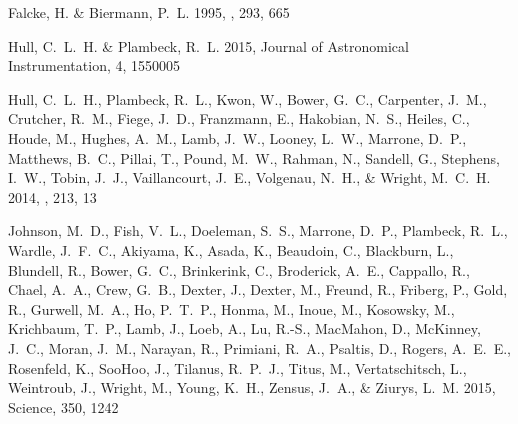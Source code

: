 \documentclass[12pt,preprint]{aastex}
\begin{document}
\begin{thebibliography}{34}
{Falcke}, H. \& {Biermann}, P.~L. 1995, \aap, 293, 665

{Hull}, C.~L.~H. \& {Plambeck}, R.~L. 2015, Journal of Astronomical
  Instrumentation, 4, 1550005

{Hull}, C.~L.~H., {Plambeck}, R.~L., {Kwon}, W., {Bower}, G.~C., {Carpenter},
  J.~M., {Crutcher}, R.~M., {Fiege}, J.~D., {Franzmann}, E., {Hakobian}, N.~S.,
  {Heiles}, C., {Houde}, M., {Hughes}, A.~M., {Lamb}, J.~W., {Looney}, L.~W.,
  {Marrone}, D.~P., {Matthews}, B.~C., {Pillai}, T., {Pound}, M.~W., {Rahman},
  N., {Sandell}, G., {Stephens}, I.~W., {Tobin}, J.~J., {Vaillancourt}, J.~E.,
  {Volgenau}, N.~H., \& {Wright}, M.~C.~H. 2014, \apjs, 213, 13

{Johnson}, M.~D., {Fish}, V.~L., {Doeleman}, S.~S., {Marrone}, D.~P.,
  {Plambeck}, R.~L., {Wardle}, J.~F.~C., {Akiyama}, K., {Asada}, K.,
  {Beaudoin}, C., {Blackburn}, L., {Blundell}, R., {Bower}, G.~C.,
  {Brinkerink}, C., {Broderick}, A.~E., {Cappallo}, R., {Chael}, A.~A., {Crew},
  G.~B., {Dexter}, J., {Dexter}, M., {Freund}, R., {Friberg}, P., {Gold}, R.,
  {Gurwell}, M.~A., {Ho}, P.~T.~P., {Honma}, M., {Inoue}, M., {Kosowsky}, M.,
  {Krichbaum}, T.~P., {Lamb}, J., {Loeb}, A., {Lu}, R.-S., {MacMahon}, D.,
  {McKinney}, J.~C., {Moran}, J.~M., {Narayan}, R., {Primiani}, R.~A.,
  {Psaltis}, D., {Rogers}, A.~E.~E., {Rosenfeld}, K., {SooHoo}, J., {Tilanus},
  R.~P.~J., {Titus}, M., {Vertatschitsch}, L., {Weintroub}, J., {Wright}, M.,
  {Young}, K.~H., {Zensus}, J.~A., \& {Ziurys}, L.~M. 2015, Science, 350, 1242


\end{thebibliography}
\end{document}
